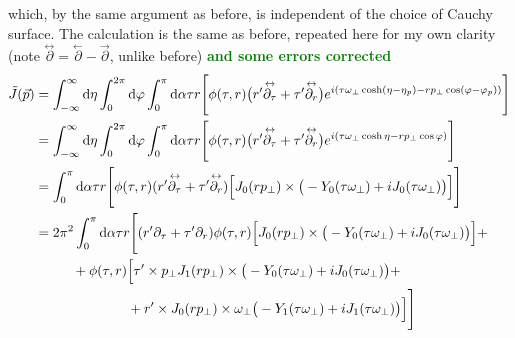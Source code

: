 which, by the same argument as before, is independent of the choice of Cauchy surface. The calculation is the same as before, repeated here for my own clarity (note $\overset{\leftrightarrow}{\partial}=\overset{\leftarrow}{\partial}-\overset{\rightarrow}{\partial}$, unlike before) \textcolor{green}{\textbf{and some errors corrected}}
\begin{subequations}
    \begin{align}
        \tilde{J}(\vec{p}) & =\int_{-\infty}^\infty\text{d}\eta\int_0^{2\pi}\text{d}\varphi\int_0^\pi\text{d}\alpha\tau r\Bigg[\phi(\tau,r)\big(r^\prime\overset{\leftrightarrow}{\partial_\tau}+\tau^\prime\overset{\leftrightarrow}{\partial_r}\big)e^{{i}(\tau \omega_\perp\cosh(\eta-\eta_p)-r p_\perp\cos(\varphi-\varphi_p))}\Bigg] \\
                           & =\int_{-\infty}^\infty\text{d}\eta\int_0^{2\pi}\text{d}\varphi\int_0^\pi\text{d}\alpha\tau r\Bigg[\phi(\tau,r)\big(r^\prime\overset{\leftrightarrow}{\partial_\tau}+\tau^\prime\overset{\leftrightarrow}{\partial_r}\big)e^{{i}(\tau \omega_\perp\cosh\eta-r p_\perp\cos\varphi)}\Bigg]                      \\
                           & =\int_0^\pi\text{d}\alpha\tau r\Bigg[\phi(\tau,r)(r^\prime\overset{\leftrightarrow}{\partial_\tau}+\tau^\prime\overset{\leftrightarrow}{\partial_r})\Big[J_0(r p_\perp)\times\big(-Y_0(\tau\omega_\perp)+{i} J_0(\tau\omega_\perp)\big)\Big]\Bigg]                                                 \\
                           & =2\pi^2\int_0^\pi\text{d}\alpha\tau r\Bigg[(r^\prime\partial_\tau+\tau^\prime\partial_r)\phi(\tau,r)\Big[J_0(r p_\perp)\times\big(-Y_0(\tau\omega_\perp)+{i} J_0(\tau\omega_\perp)\big)\Big]+\nonumber                                                                                             \\
                           & \phantom{=}\qquad + \phi(\tau,r)\Big[\tau^\prime\times p_\perp J_1(r p_\perp)\times\big(-Y_0(\tau\omega_\perp)+{i} J_0(\tau\omega_\perp)\big)+\nonumber                                                                                                                                       \\
                           & \phantom{=}\qquad\phantom{+\phi(\tau,r)\Big[}+r^\prime\times J_0(r p_\perp)\times\omega_\perp\big(-Y_1(\tau\omega_\perp)+{i} J_1(\tau\omega_\perp)\big)\Big]\Bigg]
    \end{align}
\end{subequations}

